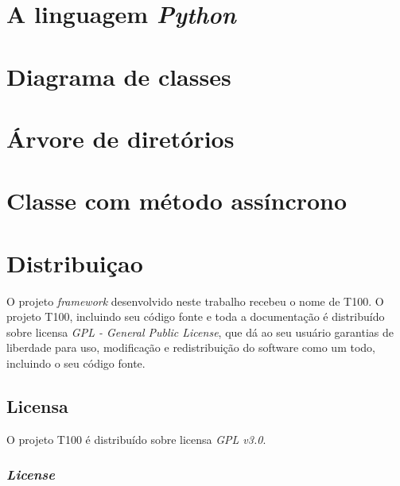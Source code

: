 \chapter{A linguagem \textit{Python} \label{appendix_python}}
\chapter{Diagrama de classes \label{appendix_uml_completo}}

\chapter{Árvore de diretórios \label{appendix_tree}}



\chapter{Classe com método assíncrono \label{appendix_proxy_example}}



\chapter{Distribuiçao}

O projeto \textit{framework} desenvolvido neste trabalho recebeu o nome de T100. O projeto T100, incluindo seu código fonte e toda a documentação é distribuído sobre licensa \textit{GPL - General Public License}, que dá ao seu usuário garantias de liberdade para uso, modificação e redistribuição do software como um todo, incluindo o seu código fonte.

\section{Licensa}

O projeto T100 é distribuído sobre licensa \textit{GPL v3.0}.

\subsection{\emph{License}}



